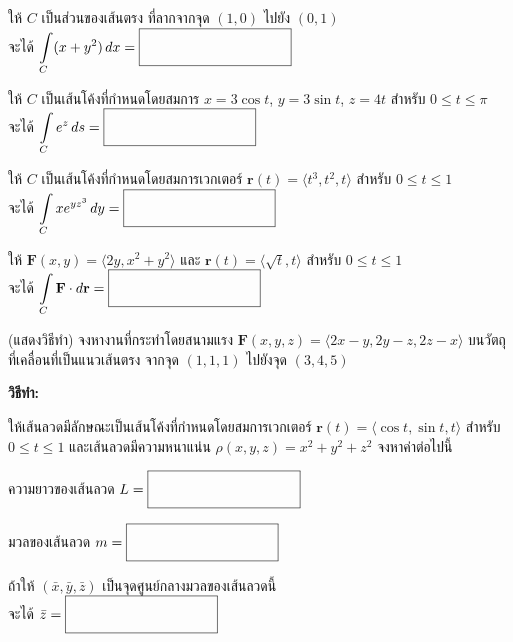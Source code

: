 \documentclass[12pt,final]{novelette} %
\begin{document}
\begin{question}
\begin{question}[itemsep=2.6cm]
        \item {} ให้ $C$ เป็นส่วนของเส้นตรง ที่ลากจากจุด $(1,0)$ ไปยัง $(0,1)$ \\[.5em]
        จะได้ $\displaystyle \int\limits_C (x + y^2) \, dx = \ansboxi{3.6cm}$

        \item {} ให้ $C$ เป็นเส้นโค้งที่กำหนดโดยสมการ $x = 3 \cos t$, $y = 3 \sin t$, $z = 4t$ สำหรับ $0 \leq t \leq \pi$ \\[.5em]
        จะได้ $\displaystyle \int\limits_C e^z \, ds = \ansboxi{3.6cm}$

        \item {} ให้ $C$ เป็นเส้นโค้งที่กำหนดโดยสมการเวกเตอร์ $\mathbf{r}(t) = \langle t^3, t^2, t \rangle$ สำหรับ $0 \leq t \leq 1$ \\[.5em]
        จะได้ $\displaystyle \int\limits_C x e^{yz^3} \, dy = \ansboxi{3.6cm}$

        \item {} ให้ $\mathbf{F}(x, y) = \langle 2y, x^2 + y^2 \rangle$ และ $\mathbf{r}(t) = \langle \sqrt{t}, t \rangle$ สำหรับ $0 \leq t \leq 1$ \\[.5em]
        จะได้ $\displaystyle \int\limits_C \mathbf{F} \cdot d\mathbf{r} = \ansboxi{3.6cm}$
    \end{question}

    \pagebreak

    \item {} %
     (แสดงวิธีทำ) จงหางานที่กระทำโดยสนามแรง $\mathbf{F}(x, y, z) = \langle 2x - y, 2y - z, 2z - x \rangle$
    บนวัตถุที่เคลื่อนที่เป็นแนวเส้นตรง จากจุด $(1, 1, 1)$ ไปยังจุด $(3, 4, 5)$

    \medskip
    \textbf{วิธีทำ:}

    \vspace{21em}

    \item {} %
     ให้เส้นลวดมีลักษณะเป็นเส้นโค้งที่กำหนดโดยสมการเวกเตอร์ $\mathbf{r}(t) = \langle \cos t, \sin t, t \rangle$ สำหรับ $0 \leq t \leq 1$
    และเส้นลวดมีความหนาแน่น $\rho(x, y, z) = x^2 + y^2 + z^2$ จงหาค่าต่อไปนี้
    \begin{question}
        \item {} ความยาวของเส้นลวด $L = \ansboxi{3.6cm}$

        \item {} มวลของเส้นลวด $m = \ansboxi{3.6cm}$

        \item {} ถ้าให้ $(\bar{x}, \bar{y}, \bar{z})$ เป็นจุดศูนย์กลางมวลของเส้นลวดนี้ \\[.5em]
        จะได้ $\bar{z} = \ansboxi{3.6cm}$
    \end{question}


\end{question}
\end{document}
